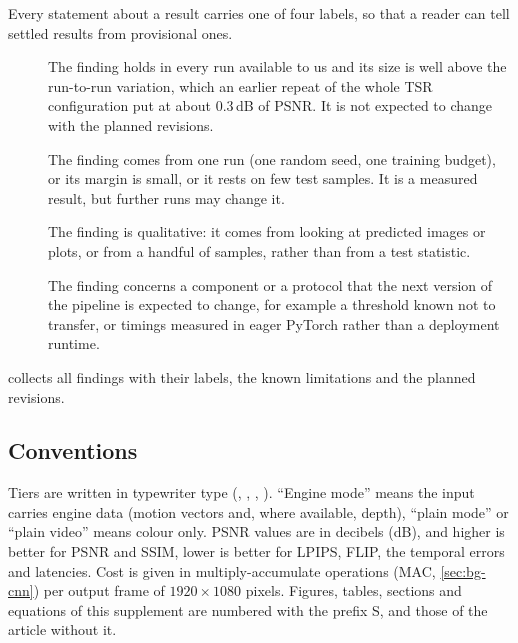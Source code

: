 Every statement about a result carries one of four labels, so that a reader can tell settled results from provisional ones.

\begin{description}
\item[\Confirmed] The finding holds in every run available to us and its size is well above the run-to-run variation, which an earlier repeat of the whole TSR configuration put at about 0.3\,dB of PSNR. It is not expected to change with the planned revisions.
\item[\Preliminary] The finding comes from one run (one random seed, one training budget), or its margin is small, or it rests on few test samples. It is a measured result, but further runs may change it.
\item[\Observation] The finding is qualitative: it comes from looking at predicted images or plots, or from a handful of samples, rather than from a test statistic.
\item[\UnderRevision] The finding concerns a component or a protocol that the next version of the pipeline is expected to change, for example a threshold known not to transfer, or timings measured in eager PyTorch rather than a deployment runtime.
\end{description}

\noindent {} collects all findings with their labels, the known limitations and the planned revisions.

\subsection{Conventions}\label{sec:overview-conventions}

Tiers are written in typewriter type (, , , ). ``Engine mode'' means the input carries engine data (motion vectors and, where available, depth), ``plain mode'' or ``plain video'' means colour only. PSNR values are in decibels (dB), and higher is better for PSNR and SSIM, lower is better for LPIPS, FLIP, the temporal errors and latencies. Cost is given in multiply-accumulate operations (MAC, \cref{sec:bg-cnn}) per output frame of $1920\times1080$ pixels. Figures, tables, sections and equations of this supplement are numbered with the prefix S, and those of the article without it.
